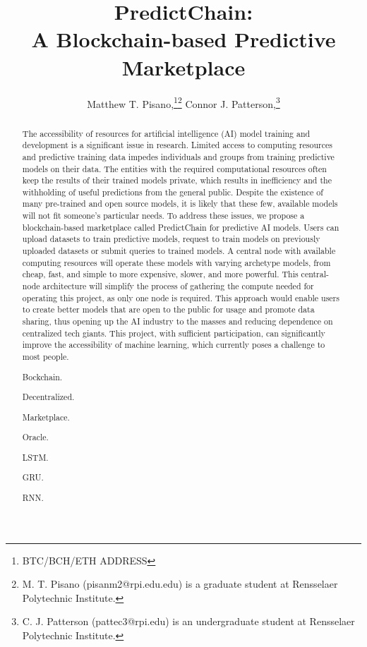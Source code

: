 \documentclass{ledger}
\title{PredictChain:\\
A Blockchain-based Predictive Marketplace}
\author{
    Matthew T. Pisano,\thanks{BTC/BCH/ETH ADDRESS}\thanks{M. T. Pisano (pisanm2@rpi.edu.edu) is a graduate
    student at Rensselaer Polytechnic Institute.} 
    Connor J. Patterson,\thanks{C. J. Patterson (pattec3@rpi.edu) is an undergraduate student at
    Rensselaer Polytechnic Institute.}
}
\begin{document}
\maketitle

\thispagestyle{pagefirst}

\begin{abstract}
The accessibility of resources for artificial intelligence (AI) model training and development is a significant issue
in research. Limited access to computing resources and predictive training data impedes individuals and groups from
training predictive models on their data. The entities with the required computational resources often keep the results
of their trained models private, which results in inefficiency and the withholding of useful predictions from the
general public. Despite the existence of many pre-trained and open source models, it is likely that these few, available
models will not fit someone's particular needs. To address these issues, we propose a blockchain-based marketplace called
PredictChain for predictive AI models. Users can upload datasets to train predictive models, request to train models on
previously uploaded datasets or submit queries to trained models. A central node with available computing resources will
operate these models with varying archetype models, from cheap, fast, and simple to more expensive, slower, and more
powerful. This central-node architecture will simplify the process of gathering the compute needed for operating this
project, as only one node is required.  This approach would enable users to create better models that are open to the
public for usage and promote data sharing, thus opening up the AI industry to the masses and reducing dependence on
centralized tech giants. This project, with sufficient participation, can significantly improve the accessibility of
machine learning, which currently poses a challenge to most people.


\begin{keywords}
\item Bockchain.
\item Decentralized.
\item Marketplace.
\item Oracle.
\item LSTM.
\item GRU.
\item RNN.
\end{keywords}
\end{abstract}
\end{document}
